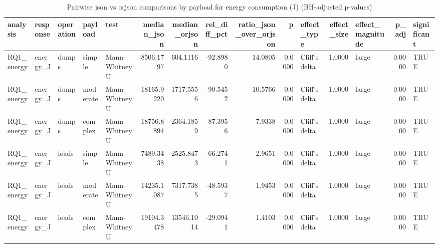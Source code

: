 \begin{table}[ht]
\centering
\begin{tabular}{lllllrrrrrlrlrl}
  \toprule
analysis & response & operation & payload & test & median\_json & median\_orjson & rel\_diff\_pct & ratio\_json\_over\_orjson & p & effect\_type & effect\_size & effect\_magnitude & p\_adj & significant \\ 
  \midrule
RQ1\_energy & energy\_J & dumps & simple & Mann-Whitney U & 8506.1797 & 604.1116 & -92.8980 & 14.0805 & 0.0000 & Cliff's delta & 1.0000 & large & 0.0000 & TRUE \\ 
  RQ1\_energy & energy\_J & dumps & moderate & Mann-Whitney U & 18165.9220 & 1717.5556 & -90.5452 & 10.5766 & 0.0000 & Cliff's delta & 1.0000 & large & 0.0000 & TRUE \\ 
  RQ1\_energy & energy\_J & dumps & complex & Mann-Whitney U & 18756.8894 & 2364.1859 & -87.3956 & 7.9338 & 0.0000 & Cliff's delta & 1.0000 & large & 0.0000 & TRUE \\ 
  RQ1\_energy & energy\_J & loads & simple & Mann-Whitney U & 7489.3438 & 2525.8473 & -66.2741 & 2.9651 & 0.0000 & Cliff's delta & 1.0000 & large & 0.0000 & TRUE \\ 
  RQ1\_energy & energy\_J & loads & moderate & Mann-Whitney U & 14235.1087 & 7317.7385 & -48.5937 & 1.9453 & 0.0000 & Cliff's delta & 1.0000 & large & 0.0000 & TRUE \\ 
  RQ1\_energy & energy\_J & loads & complex & Mann-Whitney U & 19104.3478 & 13546.1014 & -29.0941 & 1.4103 & 0.0000 & Cliff's delta & 1.0000 & large & 0.0000 & TRUE \\ 
   \bottomrule
\end{tabular}
\caption{Pairwise json vs orjson comparisons by payload for energy consumption (J) (BH-adjusted p-values)} 
\label{tab:RQ1_energy_pairwise}
\end{table}
